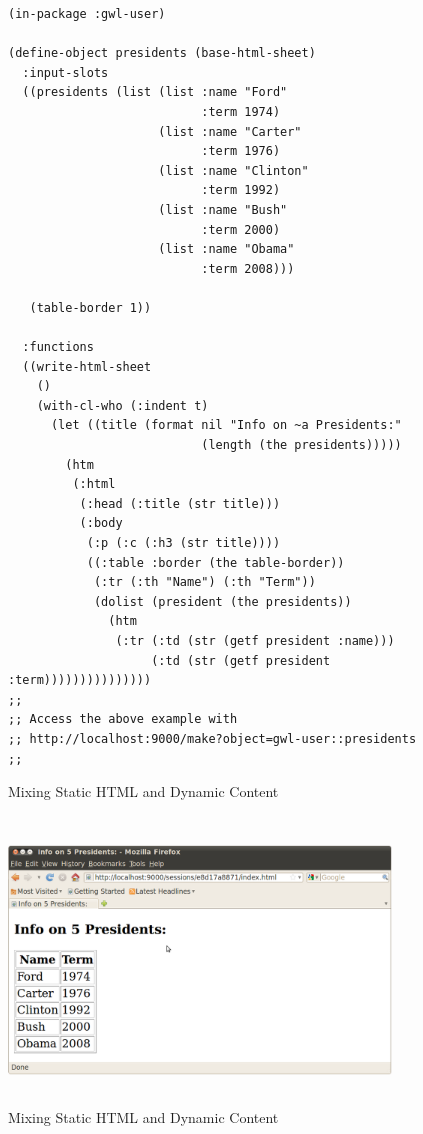 \documentclass [11pt]{book}
\begin{document}
\begin{figure}
\begin{lrbox}{\boxedverb}
\begin{minipage}{\linewidth}
\tiny{

\begin{verbatim}(in-package :gwl-user)

(define-object presidents (base-html-sheet)
  :input-slots
  ((presidents (list (list :name "Ford"
                           :term 1974)
                     (list :name "Carter"
                           :term 1976)
                     (list :name "Clinton"
                           :term 1992)
                     (list :name "Bush"
                           :term 2000)
                     (list :name "Obama"
                           :term 2008)))
   
   (table-border 1))

  :functions
  ((write-html-sheet
    () 
    (with-cl-who (:indent t)
      (let ((title (format nil "Info on ~a Presidents:" 
                           (length (the presidents)))))
        (htm
         (:html 
          (:head (:title (str title)))
          (:body 
           (:p (:c (:h3 (str title))))
           ((:table :border (the table-border))
            (:tr (:th "Name") (:th "Term"))
            (dolist (president (the presidents))
              (htm      
               (:tr (:td (str (getf president :name)))
                    (:td (str (getf president :term)))))))))))))))
;;
;; Access the above example with 
;; http://localhost:9000/make?object=gwl-user::presidents
;;

\end{verbatim}}
\end{minipage}
\end{lrbox}
\fbox{\usebox{\boxedverb}}

\caption{Mixing Static HTML and Dynamic Content}

\label{fig:gwl-2}

\end{figure}

\begin{figure}
\begin{center}
\includegraphics[width=4in,height=3in]{../images/gwl-2.png}
\end{center}

\caption{Mixing Static HTML and Dynamic Content}

\label{fig:gwl-2-image}

\end{figure}
\end{document}
